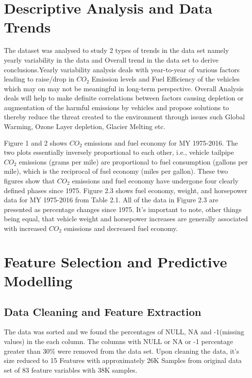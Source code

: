 \documentclass{acm_proc_article-sp}
\begin{document}
\section{Descriptive Analysis and Data Trends}
The dataset was analysed to study 2 types of trends in the data set namely yearly variability in the data and Overall trend in the data set to derive conclusions.Yearly variability analysis deals with year-to-year of various factors leading to raise/drop in $CO_{2}$ Emission levels and Fuel Efficiency of the vehicles which may on may not be meaningful in long-term perspective. Overall Analysis deals will help to make definite correlations between factors causing depletion or augmentation of the harmful emissions by vehicles and propose solutions to thereby reduce the threat created to the environment through issues such Global Warming, Ozone Layer depletion, Glacier Melting etc.

Figure 1 and 2 shows $CO_{2}$ emissions and fuel economy for MY 1975-2016. The two plots essentially inversely proportional to each other, i.e., vehicle tailpipe $CO_{2}$ emissions (grams per mile) are proportional to fuel consumption (gallons per mile), which is the reciprocal of fuel economy (miles per gallon).
These two figures show that $CO_{2}$ emissions and fuel economy have undergone four clearly defined phases since 1975. Figure 2.3 shows fuel
economy, weight, and horsepower data for MY 1975-2016 from Table 2.1. All of the data in Figure 2.3 are presented as percentage changes since 1975. It's important to note, other things being equal, that vehicle weight and horsepower increases are generally associated with increased $CO_{2}$ emissions and decreased fuel economy. 

\section{Feature Selection and Predictive Modelling}

\subsection{Data Cleaning and Feature Extraction}
The data was sorted and we found the percentages of NULL, NA and -1(missing values) in the each column. The columns with NULL or NA or -1 percentage greater than 30$\%$ were removed from the data set. Upon cleaning the data, it's size reduced to 15 Features with approximately 26K Samples from original data set of 83 feature variables with 38K samples.
\end{document}
